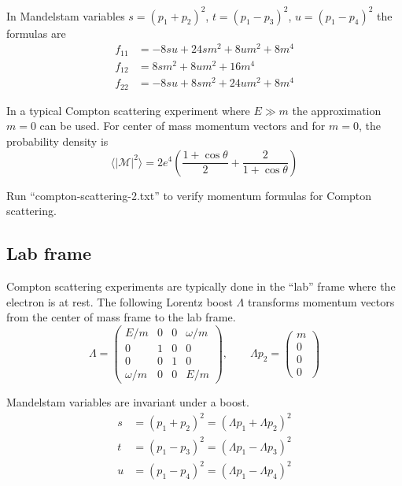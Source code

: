 \documentclass[12pt]{article}
\begin{document}
\noindent
In Mandelstam variables $s=(p_1+p_2)^2$, $t=(p_1-p_3)^2$, $u=(p_1-p_4)^2$ the formulas are
\begin{equation}
\begin{aligned}
f_{11}&=-8 s u + 24 s m^2 + 8 u m^2 + 8 m^4
\\
f_{12}&=8 s m^2 + 8 u m^2 + 16 m^4
\\
f_{22}&=-8 s u + 8 s m^2 + 24 u m^2 + 8 m^4
\end{aligned}
\end{equation}

\noindent
In a typical Compton scattering experiment where $E\gg m$ the approximation $m=0$ can be used.
For center of mass momentum vectors and for $m=0$, the probability density is
\begin{equation*}
\langle|\mathcal{M}|^2\rangle
=
2e^4\left(
\frac{1+\cos\theta}{2}+\frac{2}{1+\cos\theta}
\right)
\end{equation*}

\noindent
Run ``compton-scattering-2.txt'' to verify momentum formulas for Compton scattering.

\subsection*{Lab frame}

Compton scattering experiments are typically done in the ``lab'' frame where the electron is at rest.
The following Lorentz boost $\Lambda$ transforms momentum vectors from
the center of mass frame to the lab frame.
\begin{equation*}
\Lambda=
\begin{pmatrix}
E/m & 0 & 0 & \omega/m\\
0 & 1 & 0 & 0\\
0 & 0 & 1 & 0\\
\omega/m & 0 & 0 & E/m
\end{pmatrix},
\qquad
\Lambda p_2=\begin{pmatrix}m \\ 0 \\ 0 \\ 0\end{pmatrix}
\end{equation*}

\noindent
Mandelstam variables are invariant under a boost.
\begin{equation*}
\begin{aligned}
s&=(p_1+p_2)^2=(\Lambda p_1+\Lambda p_2)^2
\\
t&=(p_1-p_3)^2=(\Lambda p_1-\Lambda p_3)^2
\\
u&=(p_1-p_4)^2=(\Lambda p_1-\Lambda p_4)^2
\end{aligned}
\end{equation*}
\end{document}
